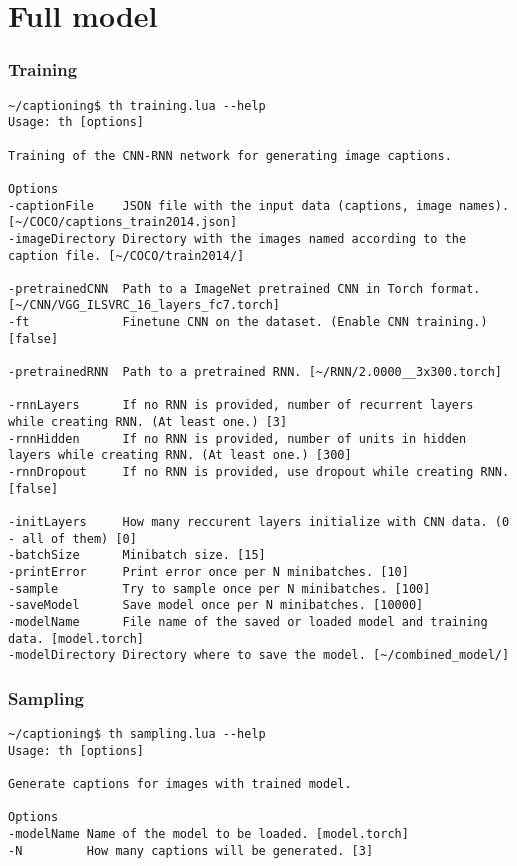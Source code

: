 \section{Full model}

\subsubsection{Training}

\begin{lstlisting}[firstnumber=1,breakindent=75pt]
~/captioning$ th training.lua --help
Usage: th [options] 

Training of the CNN-RNN network for generating image captions.

Options
-captionFile    JSON file with the input data (captions, image names). [~/COCO/captions_train2014.json]
-imageDirectory Directory with the images named according to the caption file. [~/COCO/train2014/]

-pretrainedCNN  Path to a ImageNet pretrained CNN in Torch format. [~/CNN/VGG_ILSVRC_16_layers_fc7.torch]
-ft             Finetune CNN on the dataset. (Enable CNN training.) [false]

-pretrainedRNN  Path to a pretrained RNN. [~/RNN/2.0000__3x300.torch]

-rnnLayers      If no RNN is provided, number of recurrent layers while creating RNN. (At least one.) [3]
-rnnHidden      If no RNN is provided, number of units in hidden layers while creating RNN. (At least one.) [300]
-rnnDropout     If no RNN is provided, use dropout while creating RNN. [false]

-initLayers     How many reccurent layers initialize with CNN data. (0 - all of them) [0]
-batchSize      Minibatch size. [15]
-printError     Print error once per N minibatches. [10]
-sample         Try to sample once per N minibatches. [100]
-saveModel      Save model once per N minibatches. [10000]
-modelName      File name of the saved or loaded model and training data. [model.torch]
-modelDirectory Directory where to save the model. [~/combined_model/]
\end{lstlisting}
\hspace{1cm}

\subsubsection{Sampling}

\begin{lstlisting}[firstnumber=1,breakindent=75pt]
~/captioning$ th sampling.lua --help
Usage: th [options] 

Generate captions for images with trained model.

Options
-modelName Name of the model to be loaded. [model.torch]
-N         How many captions will be generated. [3]
\end{lstlisting}
\hspace{1cm}

